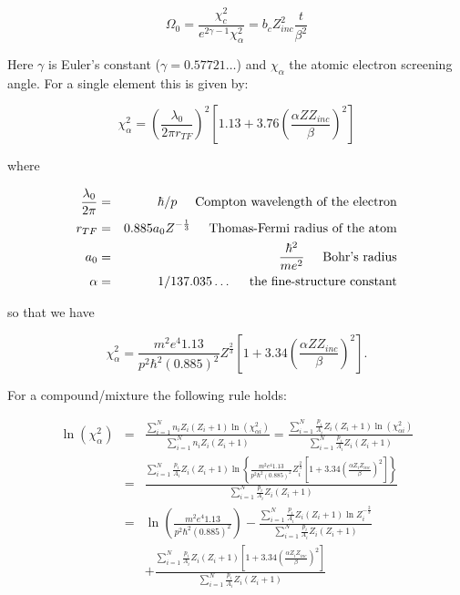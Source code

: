 \begin{equation}
\Omega_0 =\frac{ \chi^2 _c}{e^{2\gamma-1}\chi_\alpha^2} 
= b_c Z_{inc}^2\frac{t}{\beta^2}
\end{equation}

Here $\gamma$ is Euler's constant ($\gamma =0.57721\dots$)
and $\chi_\alpha$ the atomic electron
screening angle. For a single element this is given by:

\[
\chi_\alpha^2 = \left ( \frac{\lambda_0}{2 \pi r_{TF}} \right ) ^2
\left [ 1.13 + 3.76 \left ( \frac{\alpha Z Z_{inc}}{\beta} \right ) ^2 \right ]
\]

where

\begin{eqnarray*}
\frac{\lambda_0}{2 \pi} & = & \hbar/p 
\mbox{\hspace{0.5cm}Compton wavelength of the electron} \\
r_{TF} & = & 0.885 a_0 Z^{-\frac{1}{3}} \mbox{\hspace{0.5cm}Thomas-Fermi
radius of the atom} \\
a_0 & = & \frac{\hbar^2}{m e^2} \mbox{\hspace{0.5cm}Bohr's radius} \\
\alpha & = & 1/137.035 \dots \mbox{\hspace{0.5cm}the fine-structure constant}
\end{eqnarray*}

so that we have

\[
\chi_\alpha^2 = \frac{m^2 e^4 1.13}{p^2 \hbar^2 (0.885)^2} Z^{\frac{2}{3}}
\left [ 1 + 3.34 \left ( \frac{\alpha Z Z_{inc}}{\beta} \right ) ^2 \right ].
\]

For a compound/mixture the following rule holds:

\begin{eqnarray*}
\ln(\chi_\alpha^2) & = & \frac{\displaystyle \sum_{i=1}^N n_i Z_i (Z_i+1) \ln
( \chi_{\alpha i}^2)}{\displaystyle \sum_{i=1}^N n_i Z_i (Z_i+1)} = 
\frac{\displaystyle \sum_{i=1}^N \frac{p_i}{A_i} Z_i (Z_i+1) \ln
( \chi_{\alpha i}^2) }{\displaystyle \sum_{i=1}^N \frac{p_i}{A_i} Z_i (Z_i+1)}\\
& = & \frac{\displaystyle \sum_{i=1}^N \frac{p_i}{A_i} Z_i (Z_i+1) \ln \left \{
\frac{m^2 e^4 1.13}{p^2 \hbar^2 (0.885)^2} Z_i^{\frac{2}{3}}
\left [ 1 + 3.34 \left ( \frac{\alpha Z_i Z_{inc}}{\beta} \right ) ^2 \right ]
\right \} }{\displaystyle \sum_{i=1}^N \frac{p_i}{A_i} Z_i (Z_i+1)} \\
& = & \ln \left ( \frac{m^2 e^4 1.13}{p^2 \hbar^2 (0.885)^2} \right ) -
\frac{\displaystyle \sum_{i=1}^N \frac{p_i}{A_i} Z_i (Z_i+1) \ln 
Z_i^{-\frac{2}{3}}}{\displaystyle \sum_{i=1}^N \frac{p_i}{A_i} Z_i (Z_i+1)} \\
 & & + \frac{\displaystyle \sum_{i=1}^N \frac{p_i}{A_i} Z_i (Z_i+1) 
\left [ 1 + 3.34 \left ( \frac{\alpha Z_i Z_{inc}}{\beta} \right ) ^2 \right ]}
{\displaystyle \sum_{i=1}^N \frac{p_i}{A_i} Z_i (Z_i+1)} \\
\end{eqnarray*}

